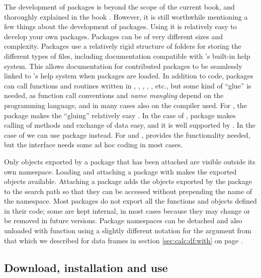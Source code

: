 \documentclass[krantz2]{krantz}\usepackage{knitr}
\begin{document}
The development of packages is beyond the scope of the current book, and thoroughly explained in the book  \autocite{Wickham2015}. However, it is still worthwhile mentioning a few things about the development of \Rpgrm packages. Using \RStudio it is relatively easy to develop your own packages. Packages can be of very different sizes and complexity. Packages use a relatively rigid structure of folders for storing the different types of files, including documentation compatible with \Rpgrm's built-in help system. This allows documentation for contributed packages to be seamlessly linked to \Rlang's help system when packages are loaded. In addition to \Rlang code, packages can call functions and routines written in , , , , , etc., but some kind of ``glue'' is needed, as function call conventions and \emph{name mangling} depend on the programming language, and in many cases also on the compiler used. For , the  \Rlang package makes the ``gluing'' relatively easy \autocite{Eddelbuettel2013}. In the case of , \Rlang package  makes calling of  methods and exchange of data easy, and it is well supported by \RStudio. In the case of  we can use package  instead. For  and , \Rlang provides the functionality needed, but the interface needs some ad hoc coding in most cases.

Only objects exported by a package that has been attached are visible outside its own namespace. Loading and attaching a package with  makes the exported objects available. Attaching a package adds the objects exported by the package to the search path so that they can be accessed without prepending the name of the namespace. Most packages do not export all the functions and objects defined in their code; some are kept internal, in most cases because they may change or be removed in future versions. Package namespaces can be detached and also unloaded with function  using a slightly different notation for the argument from that which we described for data frames in section \ref{sec:calc:df:with} on page \pageref{sec:calc:df:with}.

\subsection{Download, installation and use}
\end{document}
